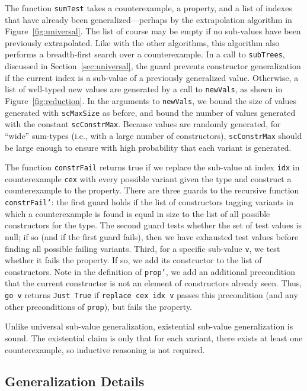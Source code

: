 \documentclass[10pt]{sigplanconf}
\newcommand{\ttp}[1]{\texttt{#1}}
\begin{document}
The function \ttp{sumTest} takes a counterexample, a property, and a list of
indexes that have already been generalized---perhaps by the extrapolation
algorithm in Figure~\ref{fig:universal}.  The list of course may be empty if no
sub-values have been previously extrapolated.  Like with the other algorithms,
this algorithm also performs a breadth-first search over a counterexample.  In a
call to \ttp{subTrees}, discussed in Section~\ref{sec:universal}, the guard
prevents constructor generalization if the current index is a sub-value of a
previously generalized value.  Otherwise, a list of well-typed new values are
generated by a call to \ttp{newVals}, as shown in Figure~\ref{fig:reduction}.
In the arguments to \ttp{newVals}, we bound the size of values generated with
\ttp{scMaxSize} as before, and bound the number of values generated with the
constant \ttp{scConstrMax}.  Because values are randomly generated, for ``wide''
sum-types (i.e., with a large number of constructors), \ttp{scConstrMax} should
be large enough to ensure with high probability that each variant is generated.

The function \ttp{constrFail} returns true if we replace the sub-value at index
\ttp{idx} in counterexample \ttp{cex} with every possible variant given the type
and construct a counterexample to the property.  There are three guards to the
recursive function \ttp{constrFail'}: the first guard holds if the list of
constructors tagging variants in which a counterexample is found is equal in
size to the list of all possible constructors for the type.  The second guard
tests whether the set of test values is null; if so (and if the first guard
fails), then we have exhausted test values before finding all possible failing
variants.  Third, for a specific sub-value \ttp{v}, we test whether it fails the
property.  If so, we add its constructor to the list of constructors.  Note in
the definition of \ttp{prop'}, we add an additional precondition that the
current constructor is not an element of constructors already seen.  Thus,
\ttp{go v} returns \ttp{Just True} if \ttp{replace cex idx v} passes this
precondition (and any other preconditions of \ttp{prop}), but fails the
property.

Unlike universal sub-value generalization, existential sub-value generalization
is sound.  The existential claim is only that for each variant, there exists at
least one counterexample, so inductive reasoning is not required.

\subsection{Generalization Details}
\end{document}
